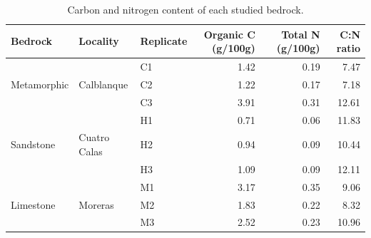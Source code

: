 \documentclass[11pt,twoside]{reedthesis}
\begin{document}
\begin{table}[H]

\caption[Carbon and nitrogen content of each studied bedrock.]{\label{tab:unnamed-chunk-41}Carbon and nitrogen content of each studied bedrock.}
\centering
\fontsize{7}{9}\selectfont
\begin{tabular}[t]{lllrrr}
\toprule
Bedrock & Locality & Replicate & Organic C (g/100g) & Total N (g/100g) & C:N ratio\\
\midrule
 &  & C1 & 1.42 & 0.19 & 7.47\\
Metamorphic & Calblanque & C2 & 1.22 & 0.17 & 7.18\\
 &  & C3 & 3.91 & 0.31 & 12.61\\
 &  & H1 & 0.71 & 0.06 & 11.83\\
Sandstone & Cuatro Calas & H2 & 0.94 & 0.09 & 10.44\\
 &  & H3 & 1.09 & 0.09 & 12.11\\
 &  & M1 & 3.17 & 0.35 & 9.06\\
Limestone & Moreras & M2 & 1.83 & 0.22 & 8.32\\
 &  & M3 & 2.52 & 0.23 & 10.96\\
\bottomrule
\end{tabular}
\end{table}\newpage
\end{document}
